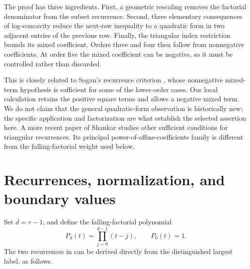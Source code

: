 \documentclass[11pt,a4paper]{article}
\numberwithin{equation}{section}
\theoremstyle{definition}
\theoremstyle{remark}
\begin{document}
The proof has three ingredients. First, a geometric rescaling removes the
factorial denominator from the subset recurrence. Second, three elementary
consequences of log-concavity reduce the next-row inequality to a quadratic
form in two adjacent entries of the previous row. Finally, the triangular
index restriction bounds its mixed coefficient. Orders three and four then
follow from nonnegative coefficients. At order five the mixed coefficient
can be negative, so it must be controlled rather than discarded.

This is closely related to Sagan's recurrence criterion
\cite[Theorem~1]{Sagan}, whose nonnegative mixed-term hypothesis is sufficient
for some of the lower-order cases. Our local calculation retains the
positive square terms and allows a negative mixed term. We do not claim
that the general quadratic-form observation is historically new; the
specific application and factorization are what establish the selected
assertion here. A more recent paper of Shankar \cite{Shankar} studies
other sufficient conditions for triangular recurrences. Its principal
power-of-affine-coefficients family is different from the falling-factorial
weight used below.

\section{Recurrences, normalization, and boundary values}\label{sec:recurrence}

Set $d=r-1$, and define the falling-factorial polynomial
\begin{equation}\label{eq:P}
 P_d(t)=\prod_{j=0}^{d-1}(t-j),\qquad P_0(t)=1.
\end{equation}
The two recurrences in \cite[Lemma~1.1]{DebSokal} can be derived directly
from the distinguished largest label, as follows.
\end{document}
